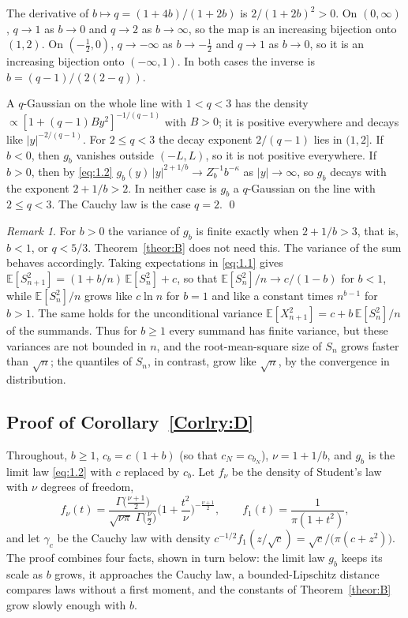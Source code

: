 \documentclass[aip,jmp,preprint,onecolumn,floatfix,superscriptaddress,nofootinbib,11pt]{revtex4-2}
\theoremstyle{plain}
\theoremstyle{remark}
\newtheorem*{remark}{Remark}
\numberwithin{equation}{section}
\newcommand{\E}{\mathbb{E}}
\begin{document}
The derivative of $b\mapsto q=(1+4b)/(1+2b)$ is $2/(1+2b)^{2}>0$. On $(0,\infty)$, $q\to1$ as $b\to0$ and $q\to2$ as $b\to\infty$, so the map is an increasing bijection onto $(1,2)$. On $(-\tfrac12,0)$, $q\to-\infty$ as $b\to-\tfrac12$ and $q\to1$ as $b\to0$, so it is an increasing bijection onto $(-\infty,1)$. In both cases the inverse is $b=(q-1)/(2(2-q))$.
 
A $q$-Gaussian on the whole line with $1<q<3$ has the density $\propto[1+(q-1)By^{2}]^{-1/(q-1)}$ with $B>0$; it is positive everywhere and decays like $|y|^{-2/(q-1)}$. For $2\le q<3$ the decay exponent $2/(q-1)$ lies in $(1,2]$. If $b<0$, then $g_b$ vanishes outside $(-L,L)$, so it is not positive everywhere. If $b>0$, then by \eqref{eq:1.2} $g_b(y)\,|y|^{2+1/b}\to Z_b^{-1}b^{-\kappa}$ as $|y|\to\infty$, so $g_b$ decays with the exponent $2+1/b>2$. In neither case is $g_b$ a $q$-Gaussian on the line with $2\le q<3$. The Cauchy law is the case $q=2$. \qed
 
\begin{remark}
For $b>0$ the variance of $g_b$ is finite exactly when $2+1/b>3$, that is, $b<1$, or $q<5/3$. Theorem~\ref{theor:B} does not need this. The variance of the sum behaves accordingly. Taking expectations in \eqref{eq:1.1} gives $\E[S_{n+1}^{2}]=(1+b/n)\,\E[S_n^{2}]+c$, so that $\E[S_n^{2}]/n\to c/(1-b)$ for $b<1$, while $\E[S_n^{2}]/n$ grows like $c\ln n$ for $b=1$ and like a constant times $n^{b-1}$ for $b>1$. The same holds for the unconditional variance $\E[X_{n+1}^{2}]=c+b\,\E[S_n^{2}]/n$ of the summands. Thus for $b\ge1$ every summand has finite variance, but these variances are not bounded in $n$, and the root-mean-square size of $S_n$ grows faster than $\sqrt n$; the quantiles of $S_n$, in contrast, grow like $\sqrt n$, by the convergence in distribution.
\end{remark}
 
\subsection{Proof of Corollary~\ref{Corlry:D}}\label{sec:5_2}
 
Throughout, $b\ge1$, $c_b=c\,(1+b)$ (so that $c_N=c_{b_N}$), $\nu=1+1/b$, and $g_b$ is the limit law \eqref{eq:1.2} with $c$ replaced by $c_b$. Let $f_\nu$ be the density of Student's law with $\nu$ degrees of freedom,
%
\begin{equation*}
f_\nu(t)=\frac{\Gamma\big(\frac{\nu+1}{2}\big)}{\sqrt{\nu\pi}\;\Gamma\big(\frac\nu2\big)}\Big(1+\frac{t^{2}}{\nu}\Big)^{-\frac{\nu+1}{2}},\qquad f_1(t)=\frac{1}{\pi(1+t^{2})},
\end{equation*}
%
and let $\gamma_c$ be the Cauchy law with density $c^{-1/2}f_1(z/\sqrt c)=\sqrt c/\big(\pi(c+z^{2})\big)$. The proof combines four facts, shown in turn below: the limit law $g_b$ keeps its scale as $b$ grows, it approaches the Cauchy law, a bounded-Lipschitz distance compares laws without a first moment, and the constants of Theorem~\ref{theor:B} grow slowly enough with $b$.
 
\end{document}
